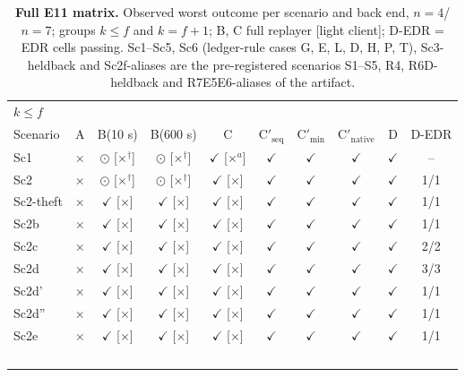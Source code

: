 \documentclass[10pt]{article}
\begin{document}
\begin{table}[!htbp]
\centering
\caption{\textbf{Full E11 matrix.} Observed worst outcome per scenario and back end, $n=4$/$n=7$; groups $k\le f$ and $k=f+1$; B, C full replayer [light client]; D-EDR = EDR cells passing. Sc1--Sc5, Sc6 (ledger-rule cases G, E, L, D, H, P, T), Sc3-heldback and Sc2f-aliases are the pre-registered scenarios S1--S5, R4, R6D-heldback and R7E5E6-aliases of the artifact.}
\label{tab:s-e11}
\tabsmall\renewcommand{\arraystretch}{1.0}\setlength{\tabcolsep}{3.6pt}
\begin{tabular}{@{}lccccccccc@{}}
\toprule
\multicolumn{10}{l}{$k \le f$} \\
Scenario & A & B(10 s) & B(600 s) & C & C$'_{\mathrm{seq}}$ & C$'_{\min}$ & C$'_{\mathrm{native}}$ & D & D-EDR \\
\midrule
Sc1 & $\times$ & $\odot$ [$\times$$^{\dagger}$] & $\odot$ [$\times$$^{\dagger}$] & $\checkmark$ [$\times$$^{a}$] & $\checkmark$ & $\checkmark$ & $\checkmark$ & $\checkmark$ & -- \\
Sc2 & $\times$ & $\odot$ [$\times$$^{\dagger}$] & $\odot$ [$\times$$^{\dagger}$] & $\checkmark$ [$\times$] & $\checkmark$ & $\checkmark$ & $\checkmark$ & $\checkmark$ & 1/1 \\
Sc2-theft & $\times$ & $\checkmark$ [$\times$] & $\checkmark$ [$\times$] & $\checkmark$ [$\times$] & $\checkmark$ & $\checkmark$ & $\checkmark$ & $\checkmark$ & 1/1 \\
Sc2b & $\times$ & $\checkmark$ [$\times$] & $\checkmark$ [$\times$] & $\checkmark$ [$\times$] & $\checkmark$ & $\checkmark$ & $\checkmark$ & $\checkmark$ & 1/1 \\
Sc2c & $\times$ & $\checkmark$ [$\times$] & $\checkmark$ [$\times$] & $\checkmark$ [$\times$] & $\checkmark$ & $\checkmark$ & $\checkmark$ & $\checkmark$ & 2/2 \\
Sc2d & $\times$ & $\checkmark$ [$\times$] & $\checkmark$ [$\times$] & $\checkmark$ [$\times$] & $\checkmark$ & $\checkmark$ & $\checkmark$ & $\checkmark$ & 3/3 \\
Sc2d' & $\times$ & $\checkmark$ [$\times$] & $\checkmark$ [$\times$] & $\checkmark$ [$\times$] & $\checkmark$ & $\checkmark$ & $\checkmark$ & $\checkmark$ & 1/1 \\
Sc2d'' & $\times$ & $\checkmark$ [$\times$] & $\checkmark$ [$\times$] & $\checkmark$ [$\times$] & $\checkmark$ & $\checkmark$ & $\checkmark$ & $\checkmark$ & 1/1 \\
Sc2e & $\times$ & $\checkmark$ [$\times$] & $\checkmark$ [$\times$] & $\checkmark$ [$\times$] & $\checkmark$ & $\checkmark$ & $\checkmark$ & $\checkmark$ & 1/1 \\
$$
\end{tabular}
\end{table}
\end{document}
